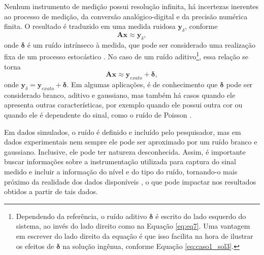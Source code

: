 Nenhum instrumento de medição possui resolução infinita, há incertezas inerentes ao processo de medição, da conversão analógico-digital e da precisão numérica finita. O resultado é traduzido em uma medida ruidosa $\mathbf{y}_{\delta}$, conforme
\begin{equation}
\mathbf{A} \mathbf{x} \approx \mathbf{y}_{\delta},
\label{eq:eq7x}
\end{equation}
onde $\bm{\delta}$ é um ruído intrínseco à medida, que pode ser considerado uma realização fixa de um processo estocástico \cite[pág. 5]{Mueller2012}. No caso de um ruído aditivo\footnote{Dependendo da referência, o ruído aditivo $\bm{\delta}$ é escrito do lado esquerdo do sistema, ao invés do lado direito como na Equação \eqref{eq:eq7}. Uma vantagem em escrever do lado direito da equação é que isso facilita na hora de ilustrar os efeitos de $\bm{\delta}$ na solução ingênua, conforme Equação \eqref{eq:caso1_sol3}.  }, essa relação se torna
\begin{equation}
\mathbf{A} \mathbf{x} \approx \mathbf{y}_{exato} + \bm{\delta},
\label{eq:eq7}
\end{equation}
onde $\mathbf{y}_{\delta} = \mathbf{y}_{exato} + \bm{\delta}$. Em algumas aplicações, é de conhecimento que $\bm{\delta}$ pode ser considerado branco, aditivo e gaussiano, mas também há casos quando ele apresenta outras características, por exemplo quando ele possui outra cor \cite[pág. 43]{hansen2010discrete} ou quando ele é dependente do sinal, como o ruído de Poisson \cite[págs. 44-5]{hansen2010discrete}. 

Em dados simulados, o ruído é definido e incluído pelo pesquisador, mas em dados experimentais nem sempre ele pode ser aproximado por um ruído branco e gaussiano. Inclusive, ele pode ter natureza desconhecida.  Assim, é importante buscar informações sobre a instrumentação utilizada para captura do sinal medido e incluir a informação do nível e do tipo do ruído, tornando-o mais próximo da realidade dos dados disponíveis \cite[pág. 163]{hansen2010discrete}, o que pode impactar nos resultados obtidos a partir de tais dados.




